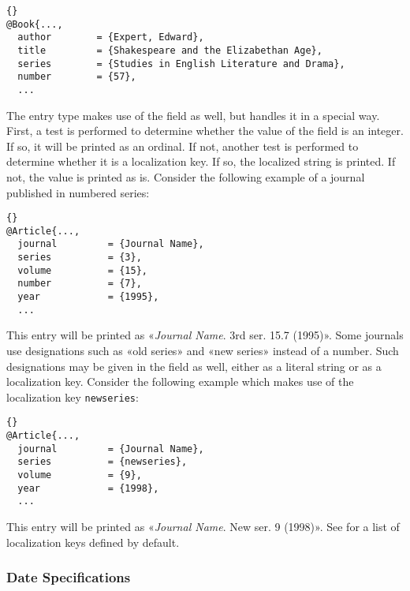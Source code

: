 \documentclass{ltxdockit}[2011/03/25]
\begin{document}
\begin{lstlisting}[style=bibtex]{}
@Book{...,
  author        = {Expert, Edward},
  title         = {Shakespeare and the Elizabethan Age},
  series        = {Studies in English Literature and Drama},
  number        = {57},
  ...
\end{lstlisting}
%
The  entry type makes use of the  field as well, but handles it in a special way. First, a test is performed to determine whether the value of the field is an integer. If so, it will be printed as an ordinal. If not, another test is performed to determine whether it is a localization key. If so, the localized string is printed. If not, the value is printed as is. Consider the following example of a journal published in numbered series:

\begin{lstlisting}[style=bibtex]{}
@Article{...,
  journal         = {Journal Name},
  series          = {3},
  volume          = {15},
  number          = {7},
  year            = {1995},
  ...
\end{lstlisting}
%
This entry will be printed as «\emph{Journal Name}. 3rd ser. 15.7 (1995)». Some journals use designations such as «old series» and «new series» instead of a number. Such designations may be given in the  field as well, either as a literal string or as a localization key. Consider the following example which makes use of the localization key \texttt{newseries}:

\begin{lstlisting}[style=bibtex]{}
@Article{...,
  journal         = {Journal Name},
  series          = {newseries},
  volume          = {9},
  year            = {1998},
  ...
\end{lstlisting}
%
This entry will be printed as «\emph{Journal Name}. New ser. 9 (1998)». See  for a list of localization keys defined by default.

\subsubsection{Date Specifications}
\label{bib:use:dat}
\end{document}
